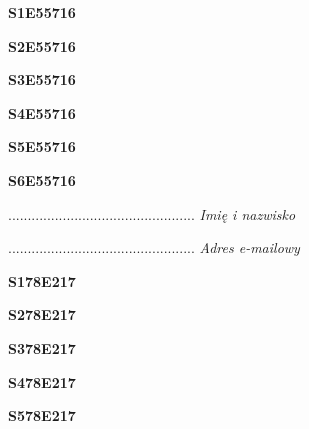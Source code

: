 \begin{turn}{90}\huge \textbf{S1E55716}\end{turn}

\begin{turn}{90}\huge \textbf{S2E55716}\end{turn}

\begin{turn}{90}\huge \textbf{S3E55716}\end{turn}

\begin{turn}{90}\huge \textbf{S4E55716}\end{turn}

\begin{turn}{90}\huge \textbf{S5E55716}\end{turn}

\begin{turn}{90}\huge \textbf{S6E55716}\end{turn}

\begin{turn}{90}\begin{minipage}{\linewidth} \vspace{20mm} ................................................  \textit{Imię i nazwisko}\end{minipage}\end{turn}

\begin{turn}{90}\begin{minipage}{\linewidth} \vspace{20mm} ................................................  \textit{Adres e-mailowy}\end{minipage}\end{turn}

\begin{turn}{90}\huge \textbf{S178E217}\end{turn}

\begin{turn}{90}\huge \textbf{S278E217}\end{turn}

\begin{turn}{90}\huge \textbf{S378E217}\end{turn}

\begin{turn}{90}\huge \textbf{S478E217}\end{turn}

\begin{turn}{90}\huge \textbf{S578E217}\end{turn}


